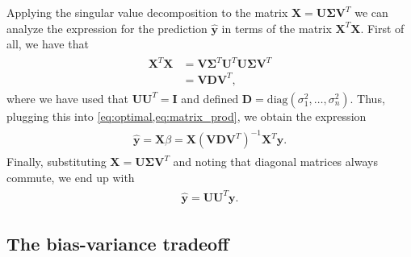 \documentclass[dvipsnames, article, a4paper, oneside, 12pt]{memoir}
\newcommand{\X}{\bm{X}}
\newcommand{\diag}[1]{\mathrm{diag}(#1)}
\newcommand{\mat}[1]{\bm{#1}}
\newcommand{\y}{\bm{y}}
\begin{document}
  Applying the singular value decomposition to the matrix \(\X = \mat{U}
  \mat{\Sigma} \mat{V}^T\) we can analyze the expression for the prediction \( \hat{\y} \)
  in terms of the matrix \( \X^T \X \).  First of all, we have that
  \begin{align}
    \begin{split}
    \X^T \X &= \mat{V}\mat{\Sigma}^T\mat{U}^T\mat{U}\mat{\Sigma} \mat{V}^T\\
            &= \mat{V}\mat{D}\mat{V}^T, 
    \end{split}
  \end{align}
  where we have used that \( \mat{U}\mat{U}^T = \mat{I} \) and defined \(
  \mat{D} = \diag{\sigma_1^2, \ldots, \sigma_n^2} \).  Thus, plugging this into
  \cref{eq:optimal,eq:matrix_prod}, we obtain the expression
  \begin{align}
    \begin{split}
      \hat{\y} = \X \beta = \X (\mat{V}\mat{D}\mat{V}^T)^{-1} \mat{X}^T \y.
    \end{split}
  \end{align}
  Finally, substituting \( \X = \mat{U}\mat{\Sigma}\mat{V}^T \) and noting that
  diagonal matrices always commute, we end up with
  \begin{align}
    \begin{split}
      \hat{\y} = \mat{U}\mat{U}^T \mat{y}.
    \end{split}
  \end{align}

  \subsection{The bias-variance tradeoff} 
  
\end{document}
